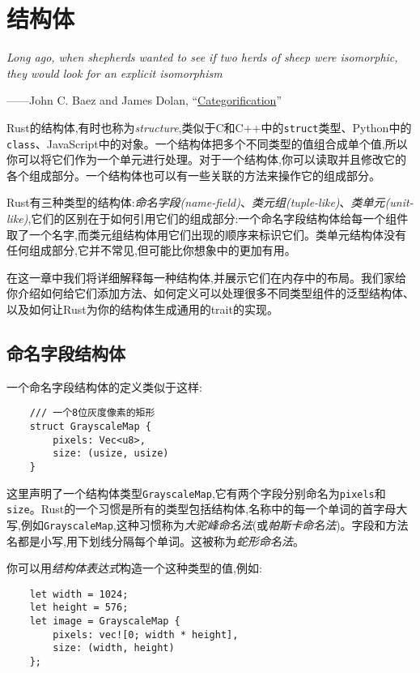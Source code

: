 \chapter{结构体}\label{ch09}

\emph{Long ago, when shepherds wanted to see if two herds of sheep were isomorphic, they would look for an explicit isomorphism}

\begin{flushright}
    ——John C. Baez and James Dolan, “\href{https://arxiv.org/abs/math/9802029}{Categorification}”
\end{flushright}

Rust的结构体,有时也称为\emph{structure},类似于C和C++中的\texttt{struct}类型、Python中的\texttt{class}、JavaScript中的对象。一个结构体把多个不同类型的值组合成单个值,所以你可以将它们作为一个单元进行处理。对于一个结构体,你可以读取并且修改它的各个组成部分。一个结构体也可以有一些关联的方法来操作它的组成部分。

Rust有三种类型的结构体:\emph{命名字段(name-field)}、\emph{类元组(tuple-like)}、\emph{类单元(unit-like)},它们的区别在于如何引用它们的组成部分:一个命名字段结构体给每一个组件取了一个名字,而类元组结构体用它们出现的顺序来标识它们。类单元结构体没有任何组成部分,它并不常见,但可能比你想象中的更加有用。

在这一章中我们将详细解释每一种结构体,并展示它们在内存中的布局。我们家给你介绍如何给它们添加方法、如何定义可以处理很多不同类型组件的泛型结构体、以及如何让Rust为你的结构体生成通用的trait的实现。

\section{命名字段结构体}

一个命名字段结构体的定义类似于这样:
\begin{verbatim}
    /// 一个8位灰度像素的矩形
    struct GrayscaleMap {
        pixels: Vec<u8>,
        size: (usize, usize)
    }
\end{verbatim}

这里声明了一个结构体类型\texttt{GrayscaleMap},它有两个字段分别命名为\texttt{pixels}和\texttt{size}。Rust的一个习惯是所有的类型包括结构体,名称中的每一个单词的首字母大写,例如\texttt{GrayscaleMap},这种习惯称为\emph{大驼峰命名法}(或\emph{帕斯卡命名法})。字段和方法名都是小写,用下划线分隔每个单词。这被称为\emph{蛇形命名法}。

你可以用\emph{结构体表达式}构造一个这种类型的值,例如:
\begin{verbatim}
    let width = 1024;
    let height = 576;
    let image = GrayscaleMap {
        pixels: vec![0; width * height],
        size: (width, height)
    };
\end{verbatim}

